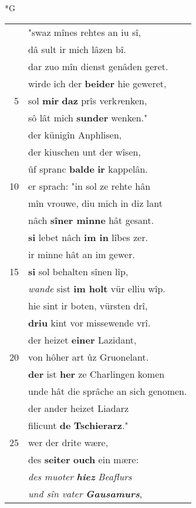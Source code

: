 \documentclass[8pt,a4paper,notitlepage]{article}
\begin{document}
\newpage
\begin{table}[ht]
\begin{minipage}[t]{0.5\linewidth}
\small
\begin{center}*G
\end{center}
\begin{tabular}{rl}
 & "swaz mînes rehtes an iu sî,\\ 
 & dâ sult ir mich lâzen bî.\\ 
 & dar zuo mîn dienst genâden geret.\\ 
 & wirde ich der \textbf{beider} hie geweret,\\ 
5 & sol \textbf{mir} \textbf{daz} prîs verk\textit{r}enken,\\ 
 & sô lât mich \textbf{sunder} wenken."\\ 
 & der künigîn Anphlisen,\\ 
 & der kiuschen unt der wîsen,\\ 
 & ûf spranc \textbf{balde} \textbf{ir} kappelân.\\ 
10 & er sprach: "in sol ze rehte hân\\ 
 & mîn vrouwe, diu mich in diz lant\\ 
 & nâch \textbf{sîner minne} hât gesant.\\ 
 & \textbf{si} lebet nâch \textbf{im in} lîbes zer.\\ 
 & ir minne hât an im gewer.\\ 
15 & \textbf{si} sol behalten sînen lîp,\\ 
 & \textit{wande} sist \textbf{im holt} vür elliu wîp.\\ 
 & hie sint ir boten, vürsten drî,\\ 
 & \textbf{driu} kint vor missewende vrî.\\ 
 & der heizet \textbf{einer} Lazidant,\\ 
20 & von hôher art ûz Gruonelant.\\ 
 & \textbf{der} ist \textbf{her} ze Charlingen komen\\ 
 & unde hât die sprâche an sich genomen.\\ 
 & der ander heizet Liadarz\\ 
 & filicunt \textbf{de} \textbf{Tschierarz}."\\ 
25 & wer der drite wære,\\ 
 & des \textbf{seiter} \textbf{ouch} ein mære:\\ 
 & \textit{des muoter} \textit{\textbf{hiez}} \textit{Beaflurs}\\ 
 & \textit{und sîn vater} \textit{\textbf{Gausamurs}},\\ 

\end{tabular}
\end{minipage}
\end{table}
\end{document}
